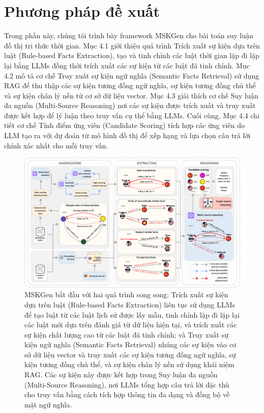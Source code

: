 \chapter{Phương pháp đề xuất}
\label{Chapter4}  

Trong phần này, chúng tôi trình bày framework MSKGen cho bài toán suy luận đồ thị tri thức thời gian. Mục 4.1 giới thiệu quá trình Trích xuất sự kiện dựa trên luật (Rule-based Facts Extraction), tạo và tinh chỉnh các luật thời gian lặp đi lặp lại bằng LLMs đồng thời trích xuất các sự kiện từ các luật đã tinh chỉnh. Mục 4.2 mô tả cơ chế Truy xuất sự kiện ngữ nghĩa (Semantic Facts Retrieval) sử dụng RAG để thu thập các sự kiện tương đồng ngữ nghĩa, sự kiện tương đồng chủ thể và sự kiện chân lý nền từ cơ sở dữ liệu vector. Mục 4.3 giải thích cơ chế Suy luận đa nguồn (Multi-Source Reasoning) nơi các sự kiện được trích xuất và truy xuất được kết hợp để lý luận theo truy vấn cụ thể bằng LLMs. Cuối cùng, Mục 4.4 chi tiết cơ chế Tính điểm ứng viên (Candidate Scoring) tích hợp các ứng viên do LLM tạo ra với dự đoán từ mô hình đồ thị để xếp hạng và lựa chọn câu trả lời chính xác nhất cho mỗi truy vấn.

\begin{figure}[!htbp]
\includegraphics[width=15cm]{images/Framework01.png}
% 
\caption{MSKGen bắt đầu với hai quá trình song song: Trích xuất sự kiện dựa trên luật (Rule-based Facts Extraction) liên tục sử dụng LLMs để tạo luật từ các luật lịch sử được lấy mẫu, tinh chỉnh lặp đi lặp lại các luật mới dựa trên đánh giá từ dữ liệu hiện tại, và trích xuất các sự kiện chất lượng cao từ các luật đã tinh chỉnh; và Truy xuất sự kiện ngữ nghĩa (Semantic Facts Retrieval) nhúng các sự kiện vào cơ sở dữ liệu vector và truy xuất các sự kiện tương đồng ngữ nghĩa, sự kiện tương đồng chủ thể, và sự kiện chân lý nền sử dụng khái niệm RAG. Các sự kiện này được kết hợp trong Suy luận đa nguồn (Multi-Source Reasoning), nơi LLMs tổng hợp câu trả lời đặc thù cho truy vấn bằng cách tích hợp thông tin đa dạng và đồng bộ về mặt ngữ nghĩa.} 
\label{fig1}
\end{figure}

